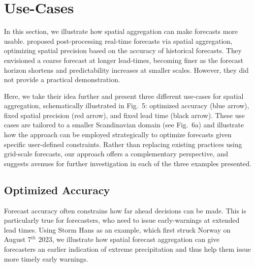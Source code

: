 \documentclass[preprint,12pt,authoryear]{elsarticle}
\begin{document}
\section{Use-Cases}

In this section, we illustrate how spatial aggregation can make forecasts more usable. \cite{RobertsLean2008} proposed post-processing real-time forecasts via spatial aggregation, optimizing spatial precision based on the accuracy of historical forecasts. They envisioned a coarse forecast at longer lead-times, becoming finer as the forecast horizon shortens and predictability increases at smaller scales. However, they did not provide a practical demonstration. 

Here, we take their idea further and present three different use-cases for spatial aggregation, schematically illustrated in Fig.~5: optimized accuracy (blue arrow), fixed spatial precision (red arrow), and fixed lead time (black arrow). These use cases are tailored to a smaller Scandinavian domain (see Fig.~6a) and illustrate how the approach can be employed strategically to optimize forecasts given specific user-defined constraints. Rather than replacing existing practices using grid-scale forecasts, our approach offers a complementary perspective, and suggests avenues for further investigation in each of the three examples presented.


\subsection{Optimized Accuracy}


Forecast accuracy often constrains how far ahead decisions can be made. This is particularly true for forecasters, who need to issue early-warnings at extended lead times. Using Storm Hans as an example, which first struck Norway on August 7$^{th}$ 2023, we illustrate how spatial forecast aggregation can give forecasters an earlier indication of extreme precipitation and thus help them issue more timely early warnings.

\end{document}
